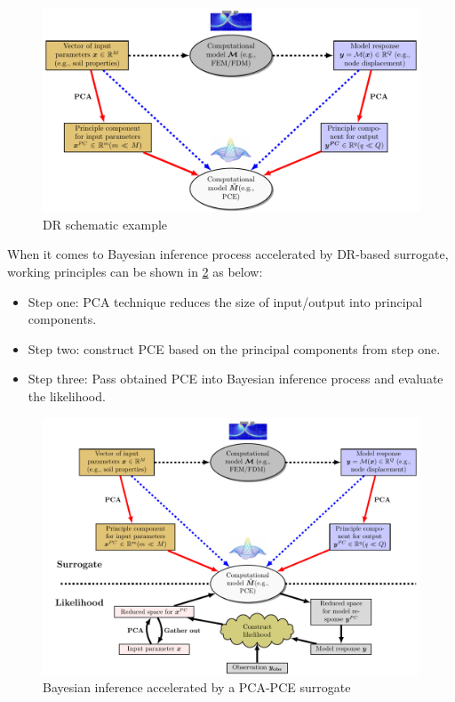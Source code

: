 \begin{figure}[htbp]
    \centering
    \includegraphics[width = 140mm]{Figures/figure-PCA_PCE.pdf}
    \caption{\acrfull{DR} schematic example}
    \label{fig: PCA-PCE}
\end{figure}
When it comes to Bayesian inference process accelerated by DR-based surrogate, working principles can be shown in \cref{fig: PCA-PCE-BI} as below:
\begin{itemize}[left = 0pt]
    \item Step one: \acrshort{PCA} technique reduces the size of input/output into principal components.
    \item Step two: construct \acrshort{PCE} based on the principal components from step one.
    \item Step three: Pass obtained \acrshort{PCE} into Bayesian inference process and evaluate the likelihood. 
\end{itemize}
\begin{figure}[H]
    \centering
    \includegraphics[width = 140mm]{Figures/figure-PCA_PCE_BI.pdf}
    \caption{Bayesian inference accelerated by a PCA-PCE surrogate}
    \label{fig: PCA-PCE-BI}
\end{figure}

